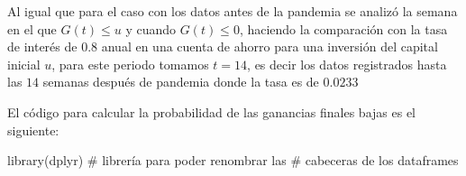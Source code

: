 \documentclass[
  us-letterpaper,
]{scrreprt}
\newenvironment{Shaded}{\begin{snugshade}}{\end{snugshade}}
\newcommand{\CommentTok}[1]{\textcolor[rgb]{0.37,0.37,0.37}{#1}}
\newcommand{\FunctionTok}[1]{\textcolor[rgb]{0.28,0.35,0.67}{#1}}
\newcommand{\NormalTok}[1]{\textcolor[rgb]{0.00,0.23,0.31}{#1}}
\theoremstyle{plain}
\theoremstyle{plain}
\theoremstyle{definition}
\theoremstyle{remark}
\begin{document}
Al igual que para el caso con los datos antes de la pandemia se analizó
la semana en el que \(G(t)\leq u\) y cuando \(G(t)\leq0\), haciendo la
comparación con la tasa de interés de \(0.8\) anual en una cuenta de
ahorro para una inversión del capital inicial \(u\), para este periodo
tomamos \(t = 14\), es decir los datos registrados hasta las \(14\)
semanas después de pandemia donde la tasa es de \(0.0233\)

El código para calcular la probabilidad de las ganancias finales bajas
es el siguiente:

\begin{Shaded}
\begin{Highlighting}[]
\FunctionTok{library}\NormalTok{(dplyr) }\CommentTok{\# librería para poder renombrar las }
\CommentTok{\# cabeceras de los dataframes}


\end{Highlighting}
\end{Shaded}
\end{document}
